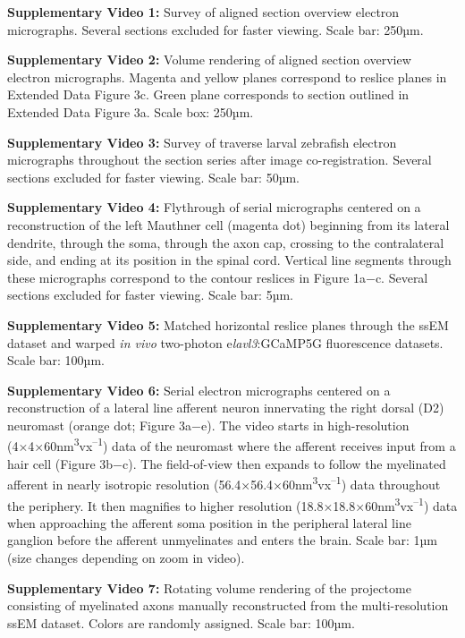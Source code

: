 \documentclass{article}
\begin{document}
\textbf{Supplementary Video 1:} Survey of aligned section overview electron micrographs. Several sections excluded for faster viewing. Scale bar: 250µm.

\textbf{Supplementary Video 2:} Volume rendering of aligned section overview electron micrographs. Magenta and yellow planes correspond to reslice planes in Extended Data Figure 3c. Green plane corresponds to section outlined in Extended Data Figure 3a. Scale box: 250µm.

\textbf{Supplementary Video 3:} Survey of traverse larval zebrafish electron micrographs throughout the section series after image co-registration. Several sections excluded for faster viewing. Scale bar: 50µm.

\textbf{Supplementary Video 4:} Flythrough of serial micrographs centered on a reconstruction of the left Mauthner cell (magenta dot) beginning from its lateral dendrite, through the soma, through the axon cap, crossing to the contralateral side, and ending at its position in the spinal cord. Vertical line segments through these micrographs correspond to the contour reslices in Figure 1a−c. Several sections excluded for faster viewing. Scale bar: 5µm.

\textbf{Supplementary Video 5:} Matched horizontal reslice planes through the ssEM dataset and warped \textit{in vivo} two-photon e\textit{lavl3}:GCaMP5G fluorescence datasets. Scale bar: 100µm.

\textbf{Supplementary Video 6:} Serial electron micrographs centered on a reconstruction of a lateral line afferent neuron innervating the right dorsal (D2) neuromast (orange dot; Figure 3a−e). The video starts in high-resolution (4×4×60nm\textsuperscript{3}vx\textsuperscript{–1}) data of the neuromast where the afferent receives input from a hair cell (Figure 3b−c). The field-of-view then expands to follow the myelinated afferent in nearly isotropic resolution (56.4×56.4×60nm\textsuperscript{3}vx\textsuperscript{–1}) data throughout the periphery. It then magnifies to higher resolution (18.8×18.8×60nm\textsuperscript{3}vx\textsuperscript{–1}) data when approaching the afferent soma position in the peripheral lateral line ganglion before the afferent unmyelinates and enters the brain. Scale bar: 1µm (size changes depending on zoom in video).

\textbf{Supplementary Video 7:} Rotating volume rendering of the projectome consisting of myelinated axons manually reconstructed from the multi-resolution ssEM dataset. Colors are randomly assigned. Scale bar: 100µm.
\end{document}
